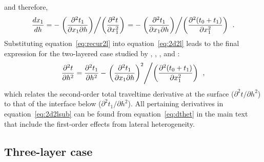 and therefore,
\begin{equation}
\label{eq:recur2l}
 \frac{d x_1}{d h} = - \left. \left(\frac{\partial^2 t_1 }{ \partial x_1 \partial h}\right) \middle/ \left(\frac{\partial^2 t }{ \partial x_1^2} \right) \right. =  - \left. \left(\frac{\partial^2 t_1 }{ \partial x_1 \partial h}\right) \middle/ \left(\frac{\partial^2 (t_0+t_1) }{ \partial x_1^2} \right) \right.  ~.
\end{equation} 
Substituting equation~\ref{eq:recur2l} into equation~\ref{eq:2d2l} leads to the final expression for the two-layered case studied by \cite{blias1981}, \cite{bliasgrit1984}, \cite{gritsenko}, and \cite{goldin}:
\begin{equation}
\label{eq:2d2lsub}
\frac{\partial^2 t}{\partial h^2} = \frac{\partial^2 t_1}{\partial h^2} - \left. \left(\frac{\partial^2 t_1 }{ \partial x_1 \partial h}\right)^2 \middle/ \left(\frac{\partial^2 (t_0+t_1) }{ \partial x_1^2} \right) \right. ~,
\end{equation}
which relates the second-order total traveltime derivative at the surface ($\partial^2 t/\partial h^2$) to that of the interface below ($\partial^2 t_1/\partial h^2$). All pertaining derivatives in equation~\ref{eq:2d2lsub} can be found from equation~\ref{eq:dthet} in the main text that include the first-order effects from lateral heterogeneity. 


\subsection{Three-layer case}

